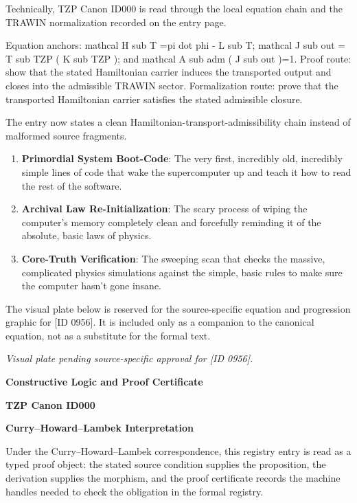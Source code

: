 Technically, TZP Canon ID000 is read through the local equation chain and the TRAWIN normalization recorded on the entry page.

Equation anchors: mathcal H sub T =pi dot phi - L sub T; mathcal J sub out = T sub TZP ( K sub TZP ); and mathcal A sub adm ( J sub out )=1. Proof route: show that the stated Hamiltonian carrier induces the transported output and closes into the admissible TRAWIN sector. Formalization route: prove that the transported Hamiltonian carrier satisfies the stated admissible closure.

The entry now states a clean Hamiltonian-transport-admissibility chain instead of malformed source fragments.
\endgroup

\begin{enumerate}[leftmargin=1.6em,itemsep=6pt,topsep=4pt]
\item \textbf{Primordial System Boot-Code}: The very first, incredibly old, incredibly simple lines of code that wake the supercomputer up and teach it how to read the rest of the software.
\item \textbf{Archival Law Re-Initialization}: The scary process of wiping the computer's memory completely clean and forcefully reminding it of the absolute, basic laws of physics.
\item \textbf{Core-Truth Verification}: The sweeping scan that checks the massive, complicated physics simulations against the simple, basic rules to make sure the computer hasn't gone insane.
\end{enumerate}

\begingroup\footnotesize\sloppy
The visual plate below is reserved for the source-specific equation and progression graphic for [ID 0956]. It is included only as a companion to the canonical equation, not as a substitute for the formal text.
\par\endgroup
\begingroup\footnotesize\itshape
Visual plate pending source-specific approval for [ID 0956].
\par\endgroup

\clearpage
\begingroup\tzpsupportsetup
\noindent\textbf{\fontsize{10.8pt}{12.8pt}\selectfont [ID 0956] Constructive Logic and Proof Certificate}\par
\noindent\textbf{\fontsize{10pt}{12pt}\selectfont TZP Canon ID000}\par
\vspace{0.45em}
\begingroup
\footnotesize
\setlength{\parskip}{0.22em}
\setlength{\parindent}{0pt}
\noindent\textbf{Curry--Howard--Lambek Interpretation}\par
Under the Curry--Howard--Lambek correspondence, this registry entry is read as a typed proof
object: the stated source condition supplies the proposition, the derivation supplies the
morphism, and the proof certificate records the machine handles needed to check the obligation
in the formal registry.

